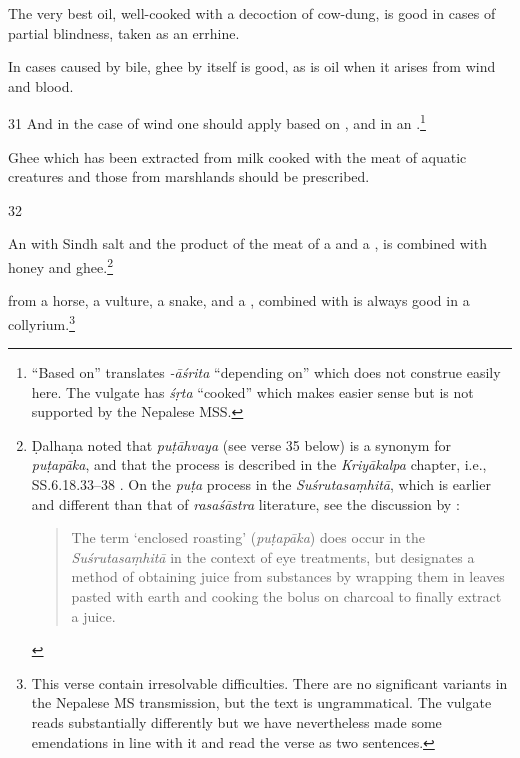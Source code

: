 \begin{translation}
    The very best oil, well-cooked with a decoction of cow-dung, is good in cases of 
    partial blindness, taken as an errhine.
    
    In cases caused by bile, ghee by itself is good, as is oil when it arises from wind and 
    blood.
    
    \item[31]
    And in the case of wind one should apply
     based on
    ,
    and 
    in an .\footnote{“Based on” translates \emph{-āśrita} 
    “depending on” which does not construe easily here.  The vulgate has \emph{śṛta} 
    “cooked” which makes easier sense but is not supported by the Nepalese MSS.}
    
    Ghee which has been extracted from milk cooked with the meat of aquatic 
    creatures and those from marshlands should be prescribed.
    
    \item[32]
    
    \dag An  with  Sindh salt and the product of the
    meat of a  and a , is combined with 
    honey
    and ghee.\footnote{Ḍalhaṇa noted \citep[628a]{vulgate} that \emph{puṭāhvaya} 
    (see
    verse 35 below) is a synonym for \emph{puṭapāka}, and that the process is
    described in the \emph{Kriyākalpa} chapter, i.e., SS.6.18.33--38
    \citep[635]{vulgate}.  On the \emph{puṭa} process in the 
    \emph{Suśrutasaṃhitā},
    which is earlier and different than that of \emph{rasaśāstra} literature, see the
    discussion by  \citet[83]{wujad-2019}:
    \begin{quote}
        The term ‘enclosed roasting’ (\emph{puṭapāka}) does occur in
        the \emph{Suśrutasaṃhitā} in the context of eye treatments, but
        designates a method of obtaining juice from substances by
        wrapping them in leaves pasted with earth and cooking
        the bolus on charcoal to finally extract a juice.
    \end{quote}
    } %
    
     from a horse, a vulture, a snake, and a ,
    combined with  is always good in a 
    collyrium.\dag\footnote{This
    verse contain irresolvable difficulties. There are no significant variants in the
    Nepalese MS transmission, but the text is ungrammatical.   The vulgate reads
    substantially differently but we have nevertheless made some emendations in line
    with it and read the verse as two sentences.}
    

\end{translation}
